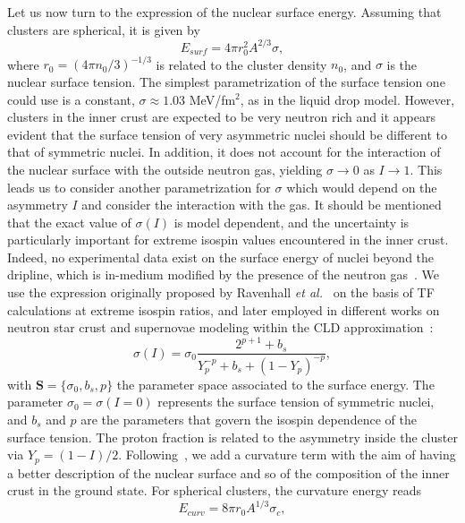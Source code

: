 Let us now turn to the expression of the nuclear surface energy. Assuming that
clusters are spherical, it is given by
%
\begin{equation}
  E_{surf} = 4\pi r_0^2A^{2/3}\sigma,\label{eq:esurf}
\end{equation}
%
where $r_0 = (4\pi n_0/3)^{-1/3}$ is related to the cluster density $n_0$, and
$\sigma$ is the nuclear surface tension. The simplest parametrization of the
surface tension one could use is a constant, $\sigma \approx 1.03$ MeV/fm$^2$, 
as in the liquid drop model. %
However, clusters in the inner crust are expected to be very neutron rich and
it appears evident that the surface tension of very asymmetric nuclei should be
different to that of symmetric nuclei. In addition, it does not account for
the interaction of the nuclear surface with the outside neutron gas, yielding 
$\sigma \rightarrow 0$ as $I\rightarrow 1$. 
This leads us to consider another parametrization for $\sigma$ which would 
depend on the asymmetry $I$ and consider the interaction with the gas.
It should be mentioned that the exact value of $\sigma(I)$ is model dependent, 
and the uncertainty is particularly important for extreme isospin values 
encountered in the inner crust. Indeed, no experimental data exist on the 
surface energy of nuclei beyond the dripline, which is in-medium modified by 
the presence of the neutron gas~\cite{Douchin2000b}.
We use the expression originally proposed by Ravenhall \textit{et
al.}~\cite{Ravenhall1983} on the basis of TF calculations at
extreme isospin ratios, and later employed in different works on neutron star
crust and supernovae modeling within the 
CLD approximation~\cite{Lattimer1991,Newton2012,Lorenz1993}:
%
\begin{equation}
  \sigma(I) = \sigma_0\frac{2^{p+1} + b_s}{Y_p^{-p} + b_s + (1 -
  Y_p)^{-p}},\label{eq:sigma}
\end{equation}
%
with $\bm{S} = \{\sigma_0, b_s, p\}$ the parameter space associated to the
surface energy. The parameter $\sigma_0 = \sigma(I=0)$ represents the surface 
tension of symmetric nuclei, and $b_s$ and $p$ are the parameters that govern 
the isospin dependence of the surface tension. The proton fraction is 
related to the asymmetry inside the cluster via $Y_p = (1-I)/2$. 
Following~\cite{Newton2012}, we add a curvature term with the aim of having a
better description of the nuclear surface and so of the composition of the
inner crust in the ground state. For spherical clusters, the curvature energy
reads
%
\begin{equation}
  E_{curv} = 8\pi r_0A^{1/3}\sigma_c,\label{eq:ecurv}
\end{equation}

